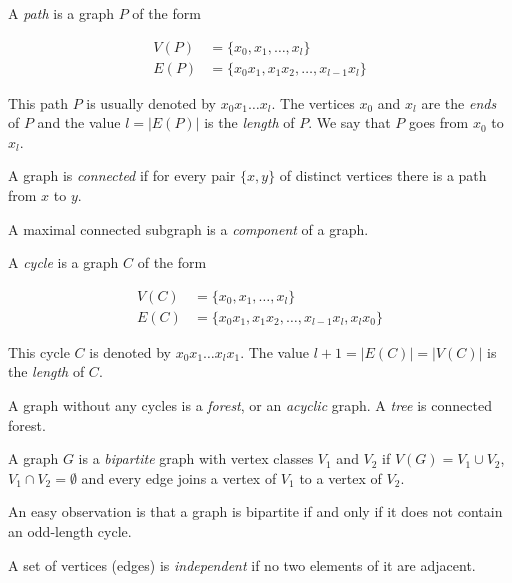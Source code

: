 \begin{defn}[path]
    A \emph{path} is a graph $P$ of the form

    \begin{align*}
        V(P) &= \{x_0, x_1, \dots, x_l\} \\
        E(P) &= \{x_0x_1, x_1x_2, \dots, x_{l-1}x_l\}
    \end{align*}
\end{defn}

This path $P$ is usually denoted by $x_0x_1\dots x_l$. The vertices $x_0$ and $x_l$ are the \emph{ends} of $P$ and the value $l = |E(P)|$ is the \emph{length} of $P$. We say that $P$ goes from $x_0$ to $x_l$.

\begin{defn}
    A graph is \emph{connected} if for every pair $\{x, y\}$ of distinct vertices there is a path from $x$ to $y$.
\end{defn}

A maximal connected subgraph is a \emph{component} of a graph.

\begin{defn}[cycle]
    A \emph{cycle} is a graph $C$ of the form

    \begin{align*}
        V(C) &= \{x_0, x_1, \dots, x_l\} \\
        E(C) &= \{x_0x_1, x_1x_2, \dots, x_{l-1}x_l, x_l x_0\}
    \end{align*}
\end{defn}

This cycle $C$ is denoted by $x_0 x_1\dots x_l x_1$. The value $l + 1 = |E(C)| = |V(C)|$ is the \emph{length} of $C$. 

\begin{defn}
    A graph without any cycles is a \emph{forest}, or an \emph{acyclic} graph. A \emph{tree} is connected forest.
\end{defn}

\begin{defn}
    A graph $G$ is a \emph{bipartite} graph with vertex classes $V_1$ and $V_2$ if $V(G) = V_1 \cup V_2$, $V_1 \cap V_2 = \emptyset$ and every edge joins a vertex of $V_1$ to a vertex of $V_2$.
\end{defn}

An easy observation is that a graph is bipartite if and only if it does not contain an odd-length cycle.

A set of vertices (edges) is \emph{independent} if no two elements of it are adjacent.

